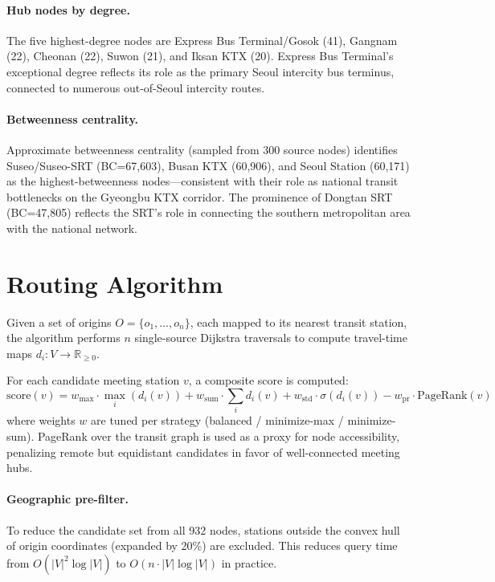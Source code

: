 \documentclass[12pt]{article}
\begin{document}
\paragraph{Hub nodes by degree.}
The five highest-degree nodes are Express Bus Terminal/Gosok (41),
Gangnam (22), Cheonan (22), Suwon (21), and Iksan KTX (20).
Express Bus Terminal's exceptional degree reflects its role as the
primary Seoul intercity bus terminus, connected to numerous
out-of-Seoul intercity routes.

\paragraph{Betweenness centrality.}
Approximate betweenness centrality (sampled from 300 source nodes)
identifies Suseo/Suseo-SRT (BC=67,603), Busan KTX (60,906), and
Seoul Station (60,171) as the highest-betweenness nodes---consistent
with their role as national transit bottlenecks on the Gyeongbu KTX
corridor. The prominence of Dongtan SRT (BC=47,805) reflects the
SRT's role in connecting the southern metropolitan area with the
national network.

\section{Routing Algorithm}
\label{sec:routing}

Given a set of origins $O = \{o_1, \ldots, o_n\}$, each mapped to its
nearest transit station, the algorithm performs $n$ single-source
Dijkstra traversals to compute travel-time maps
$d_i: V \rightarrow \mathbb{R}_{\geq 0}$.

For each candidate meeting station $v$, a composite score is computed:
\begin{equation}
  \text{score}(v) = w_{\text{max}} \cdot \max_i(d_i(v))
                  + w_{\text{sum}} \cdot \textstyle\sum_i d_i(v)
                  + w_{\text{std}} \cdot \sigma(d_i(v))
                  - w_{\text{pr}} \cdot \text{PageRank}(v)
\end{equation}
where weights $w$ are tuned per strategy (balanced / minimize-max /
minimize-sum). PageRank over the transit graph is used as a proxy for
node accessibility, penalizing remote but equidistant candidates in
favor of well-connected meeting hubs.

\paragraph{Geographic pre-filter.}
To reduce the candidate set from all 932 nodes, stations outside the
convex hull of origin coordinates (expanded by 20\%) are excluded.
This reduces query time from $O(|V|^2 \log |V|)$ to
$O(n \cdot |V| \log |V|)$ in practice.
\end{document}
